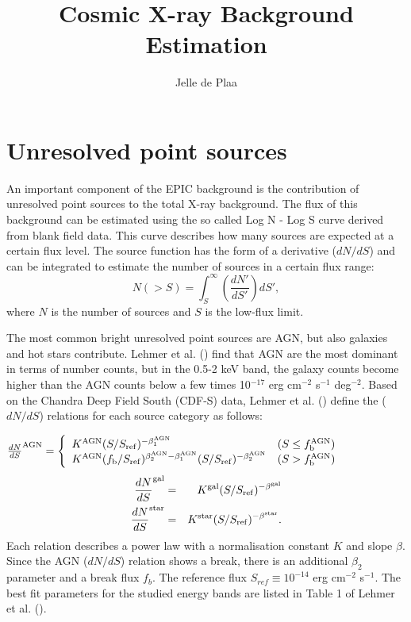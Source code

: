 \documentclass[10pt,a4paper]{article}
\title{Cosmic X-ray Background Estimation}
\author{Jelle de Plaa}
\begin{document}
\maketitle

\section{Unresolved point sources}

An important component of the EPIC background is the contribution of unresolved point sources to the total X-ray background. The flux of this background can be estimated using the so called Log N - Log S curve derived from blank field data. This curve describes how many sources are expected at a certain flux level. The source function has the form of a derivative ($dN/dS$) and can be integrated to estimate the number of sources in a certain flux range:
\begin{equation}
N (>S) = \int_{S}^{\infty} \left( \frac{dN'}{dS'} \right) dS',
\label{eq:src_number}
\end{equation}
where $N$ is the number of sources and $S$ is the low-flux limit.

The most common bright unresolved point sources are AGN, but also galaxies and hot stars contribute. Lehmer et al. (\cite{lehmer2012}) find that AGN are the most dominant in terms of number counts, but in the 0.5-2 keV band, the galaxy counts become higher than the AGN counts below a few times 10$^{-17}$ erg cm$^{-2}$ s$^{-1}$ deg$^{-2}$. Based on the Chandra Deep Field South (CDF-S) data,
Lehmer et al. (\cite{lehmer2012}) define the ($dN/dS$) relations for each source category as follows: 

$  \frac{dN}{dS}^{\rm AGN} =  \left\{ 
\begin{array}{l l}
K^{\rm AGN} (S/S_{\rm ref})^{-\beta_1^{\rm AGN}}  & (S \le f^{\rm AGN}_{\rm b}) \\
K^{\rm AGN} (f_{\rm b}/S_{\rm ref})^{\beta_2^{\rm AGN} - \beta_1^{\rm AGN}}(S/S_{\rm ref})^{-\beta_2^{\rm AGN}} &  (S > f^{\rm AGN}_{\rm b}) \\ \end{array} \right.  $
\begin{eqnarray}
\frac{dN}{dS}^{\rm gal} & = & K^{\rm gal} (S/S_{\rm
ref})^{-\beta^{\rm gal}} \nonumber \\
\frac{dN}{dS}^{\rm star} & = & K^{\rm star} (S/S_{\rm
ref})^{-\beta^{\rm star}}.
\label{eq:lognlogs}
\end{eqnarray}
Each relation describes a power law with a normalisation constant $K$ and slope $\beta$. Since the AGN ($dN/dS$) relation shows a break, there is an additional $\beta_2$ parameter and a break flux $f_b$. The reference flux $S_{ref} \equiv 10^{-14}$ erg cm$^{-2}$ s$^{-1}$. The best fit parameters
for the studied energy bands are listed in Table 1 of Lehmer et al. (\cite{lehmer2012}).
\end{document}
